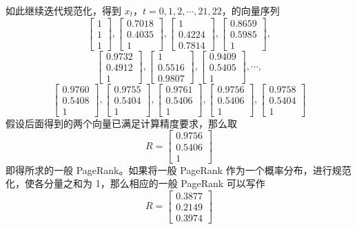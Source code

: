 \documentclass[UTF8, 12pt, fontset=fandol, oneside]{ctexart}
\begin{document}
如此继续迭代规范化，得到 $x_t$，$t=0,1,2,\cdots,21,22$，的向量序列
\[
\begin{bmatrix}
1\\
1\\
1
\end{bmatrix},
\begin{bmatrix}
0.7018\\
0.4035\\
1
\end{bmatrix},
\begin{bmatrix}
1\\
0.4224\\
0.7814
\end{bmatrix},
\begin{bmatrix}
0.8659\\
0.5985\\
1
\end{bmatrix},
\]
\[
\begin{bmatrix}
0.9732\\
0.4912\\
1
\end{bmatrix},
\begin{bmatrix}
1\\
0.5516\\
0.9807
\end{bmatrix},
\begin{bmatrix}
0.9409\\
0.5405\\
1
\end{bmatrix},
\cdots,
\]
\[
\begin{bmatrix}
0.9760\\
0.5408\\
1
\end{bmatrix},
\begin{bmatrix}
0.9755\\
0.5404\\
1
\end{bmatrix},
\begin{bmatrix}
0.9761\\
0.5406\\
1
\end{bmatrix},
\begin{bmatrix}
0.9756\\
0.5406\\
1
\end{bmatrix},
\begin{bmatrix}
0.9758\\
0.5404\\
1
\end{bmatrix}
\]
假设后面得到的两个向量已满足计算精度要求，那么取
\[
R=
\begin{bmatrix}
0.9756\\
0.5406\\
1
\end{bmatrix}
\]
即得所求的一般 PageRank。如果将一般 PageRank 作为一个概率分布，进行规范化，使各分量之和为 1，那么相应的一般 PageRank 可以写作
\[
R=
\begin{bmatrix}
0.3877\\
0.2149\\
0.3974
\end{bmatrix}
\]
\end{document}
